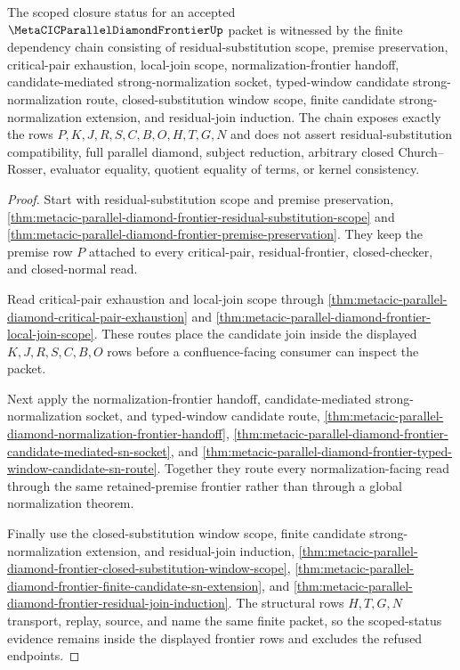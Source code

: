 \begin{theorem}
\label{thm:metacic-parallel-diamond-frontier-scoped-status-route}
The scoped closure status for an accepted $\MetaCICParallelDiamondFrontierUp$ packet is witnessed by the finite dependency chain consisting of residual-substitution scope, premise preservation, critical-pair exhaustion, local-join scope, normalization-frontier handoff, candidate-mediated strong-normalization socket, typed-window candidate strong-normalization route, closed-substitution window scope, finite candidate strong-normalization extension, and residual-join induction. The chain exposes exactly the rows $P,K,J,R,S,C,B,O,H,T,G,N$ and does not assert residual-substitution compatibility, full parallel diamond, subject reduction, arbitrary closed Church--Rosser, evaluator equality, quotient equality of terms, or kernel consistency.
\end{theorem}
\begin{proof}
Start with residual-substitution scope and premise preservation, \autoref{thm:metacic-parallel-diamond-frontier-residual-substitution-scope} and \autoref{thm:metacic-parallel-diamond-frontier-premise-preservation}. They keep the premise row $P$ attached to every critical-pair, residual-frontier, closed-checker, and closed-normal read.

Read critical-pair exhaustion and local-join scope through \autoref{thm:metacic-parallel-diamond-critical-pair-exhaustion} and \autoref{thm:metacic-parallel-diamond-frontier-local-join-scope}. These routes place the candidate join inside the displayed $K,J,R,S,C,B,O$ rows before a confluence-facing consumer can inspect the packet.

Next apply the normalization-frontier handoff, candidate-mediated strong-normalization socket, and typed-window candidate route, \autoref{thm:metacic-parallel-diamond-normalization-frontier-handoff}, \autoref{thm:metacic-parallel-diamond-frontier-candidate-mediated-sn-socket}, and \autoref{thm:metacic-parallel-diamond-frontier-typed-window-candidate-sn-route}. Together they route every normalization-facing read through the same retained-premise frontier rather than through a global normalization theorem.

Finally use the closed-substitution window scope, finite candidate strong-normalization extension, and residual-join induction, \autoref{thm:metacic-parallel-diamond-frontier-closed-substitution-window-scope}, \autoref{thm:metacic-parallel-diamond-frontier-finite-candidate-sn-extension}, and \autoref{thm:metacic-parallel-diamond-frontier-residual-join-induction}. The structural rows $H,T,G,N$ transport, replay, source, and name the same finite packet, so the scoped-status evidence remains inside the displayed frontier rows and excludes the refused endpoints.
\end{proof}


